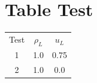 \documentclass{article}
\begin{document}
\section{Table Test}

\begin{tabular}{ccc}
Test & $\rho_L$ & $u_L$ \\
1 & 1.0 & 0.75 \\
2 & 1.0 & 0.0 \\
\end{tabular}
\end{document}
